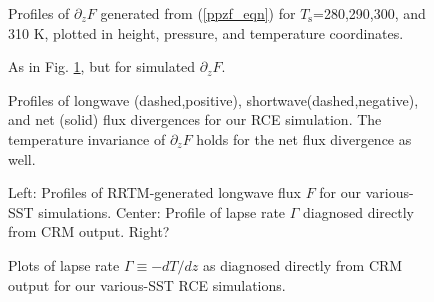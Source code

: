 \documentclass[10pt]{article}
\newcommand{\eqnref}[1]{(\ref{#1})}
\newcommand{\ppz}{\ensuremath{\partial_z}}
\newcommand{\Ts}{\ensuremath{T_\mathrm{s}}}
\begin{document}
\begin{figure}[h]
	\begin{center}
		\caption{Profiles of  $\ppz F$ generated from \eqnref{ppzf_eqn}  for \Ts=280,290,300, and 310 K, plotted in height, pressure, and temperature coordinates.
		\label{ppzf_tinv_theory}
		}
	\end{center}
\end{figure}

\begin{figure}[h]
	\begin{center}
		\caption{As in Fig. \ref{ppzf_tinv_theory}, but for simulated $\ppz F$.
		\label{ppzf_tinv_dam}
		}
	\end{center}
\end{figure}

\begin{figure}[h]
	\begin{center}
		\caption{Profiles of longwave (dashed,positive), shortwave(dashed,negative), and net (solid) flux divergences for our RCE simulation. The temperature invariance of $\ppz F$ holds for the net flux divergence as well.
		\label{ppzf_net}
		}
	\end{center}
\end{figure}

\begin{figure}[h]
	\begin{center}
		\caption{Left: Profiles of RRTM-generated longwave flux $F$ for our various-SST simulations. Center: Profile of lapse rate $\Gamma$ diagnosed directly from CRM output. Right?
		\label{fluxes}
		}
	\end{center}
\end{figure}

\begin{figure}[h]
	\begin{center}
		\caption{Plots of lapse rate $\Gamma \equiv - dT/dz$ as diagnosed directly from CRM output for our various-SST RCE simulations.
		\label{lapse_rates}
		}
	\end{center}
\end{figure}






%
\end{document}
